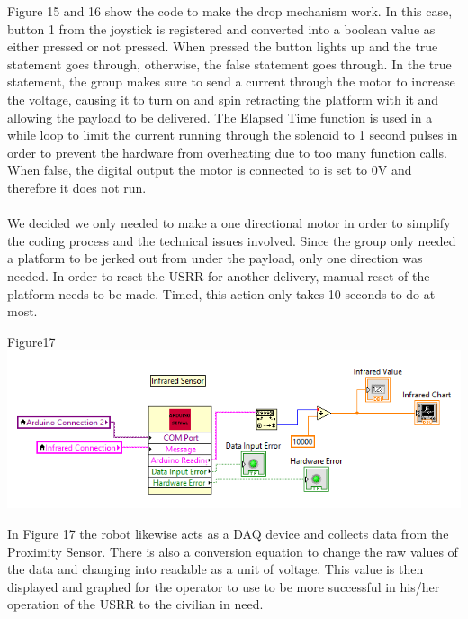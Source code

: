 \documentclass{article}
\begin{document}
Figure 15 and 16 show the code to make the drop mechanism work. In this case, button 1 from the joystick is registered and converted into a boolean value as either pressed or not pressed. When pressed the button lights up and the true statement goes through, otherwise, the false statement goes through. In the true statement, the group makes sure to send a current through the motor to increase the voltage, causing it to turn on and spin retracting the platform with it and allowing the payload to be delivered. The Elapsed Time function is used in a while loop to limit the current running through the solenoid to 1 second pulses in order to prevent the hardware from overheating due to too many function calls. When false, the digital output the motor is connected to is set to 0V and therefore it does not run. 
\\\\We decided we only needed to make a one directional motor in order to simplify the coding process and the technical issues involved. Since the group only needed a platform to be jerked out from under the payload, only one direction was needed. In order to reset the USRR for another delivery, manual reset of the platform needs to be made. Timed, this action only takes 10 seconds to do at most.

\begin{center}{Figure17 \includegraphics[width=\textwidth]{InfraRedSensor.png}}\end{center}
In Figure 17 the robot likewise acts as a DAQ device and collects data from the Proximity Sensor. There is also a conversion equation to change the raw values of the data and changing into readable as a unit of voltage. This value is then displayed and graphed for the operator to use to be more successful in his/her operation of the USRR to the civilian in need.
\end{document}
